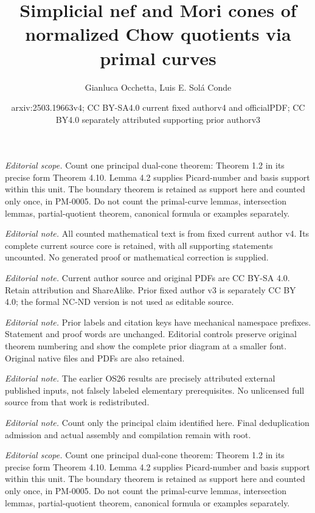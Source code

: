 \documentclass[10pt,a4paper]{article}
\title{Simplicial nef and Mori cones of normalized Chow quotients via primal curves}
\author{Gianluca Occhetta, Luis E. Solá Conde}
\date{arxiv:2503.19663v4; CC BY-SA4.0 current fixed authorv4 and officialPDF; CC BY4.0 separately attributed supporting prior authorv3}
\numberwithin{equation}{section}
\theoremstyle{definition}
\theoremstyle{remark}
\begin{document}
\maketitle
\setcounter{section}{1}
\setcounter{theorem}{0}
\noindent\textit{Editorial scope.} Count one principal dual-cone theorem: Theorem 1.2 in its precise form Theorem 4.10. Lemma 4.2 supplies Picard-number and basis support within this unit. The boundary theorem is retained as support here and counted only once, in PM-0005. Do not count the primal-curve lemmas, intersection lemmas, partial-quotient theorem, canonical formula or examples separately.\par\medskip
\noindent\textit{Editorial note.} All counted mathematical text is from fixed current author v4. Its complete current source core is retained, with all supporting statements uncounted. No generated proof or mathematical correction is supplied.\par\medskip
\noindent\textit{Editorial note.} Current author source and original PDFs are CC BY-SA 4.0. Retain attribution and ShareAlike. Prior fixed author v3 is separately CC BY 4.0; the formal NC-ND version is not used as editable source.\par\medskip
\noindent\textit{Editorial note.} Prior labels and citation keys have mechanical namespace prefixes. Statement and proof words are unchanged. Editorial controls preserve original theorem numbering and show the complete prior diagram at a smaller font. Original native files and PDFs are also retained.\par\medskip
\noindent\textit{Editorial note.} The earlier OS26 results are precisely attributed external published inputs, not falsely labeled elementary prerequisites. No unlicensed full source from that work is redistributed.\par\medskip
\noindent\textit{Editorial note.} Count only the principal claim identified here. Final deduplication admission and actual assembly and compilation remain with root.\par\medskip
\noindent\textit{Editorial scope.} Count one principal dual-cone theorem: Theorem 1.2 in its precise form Theorem 4.10. Lemma 4.2 supplies Picard-number and basis support within this unit. The boundary theorem is retained as support here and counted only once, in PM-0005. Do not count the primal-curve lemmas, intersection lemmas, partial-quotient theorem, canonical formula or examples separately.\par\medskip
\end{document}
